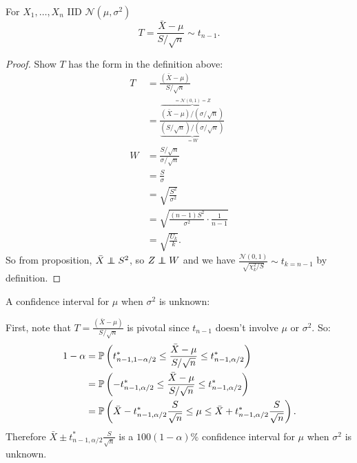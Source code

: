 \documentclass[10pt, a4paper]{article}
\begin{document}
\begin{proposition}
    For $X_1, \dotsc, X_n$ IID $\mathcal{N}(\mu, \sigma ^ 2)$
    \[
    T = \frac{\bar{X} - \mu}{S / \sqrt{n}} \sim t_{n - 1}.
    \]

    \begin{proof}
        Show $T$ has the form in the definition above:
        \begin{align*}
            T &= \frac{(\bar{X} - \mu)}{S / \sqrt{n}} \\
            &= \frac{\overbrace{(\bar{X} - \mu) / (\sigma / \sqrt{n})}^{= \mathcal{N}(0, 1) = Z}}{\underbrace{(S / \sqrt{n}) / (\sigma / \sqrt{n})}_{= W}} \\
            W &= \frac{S / \sqrt{n}}{\sigma / \sqrt{n}} \\
            &= \frac{S}{\sigma} \\
            &= \sqrt{\frac{S ^ 2}{\sigma ^ 2}} \\
            &= \sqrt{\frac{(n - 1)S ^ 2}{\sigma ^ 2}\cdot\frac{1}{n - 1}} \\
            &= \sqrt{\frac{U_k}{k}}.
        \end{align*}
        So from proposition,
        $\bar{X} \independent S ^ 2$,
        so $Z \independent W$ and we have $\frac{\mathcal{N}(0, 1)}{\sqrt{\chi_{k}^{2} / S}} \sim t_{k = n - 1}$ by definition.
    \end{proof}
\end{proposition}

A confidence interval for $\mu$ when $\sigma ^ 2$ is unknown:
\begin{proposition}
    First,
    note that $T = \frac{(\bar{X} - \mu)}{S / \sqrt{n}}$ is pivotal since $t_{n - 1}$ doesn't involve $\mu$ or $\sigma ^ 2$.
    So:
    \begin{align*}
        1 - \alpha &= \P\left(t_{n - 1, 1 - \alpha / 2}^{*} \leq \frac{\bar{X} - \mu}{S / \sqrt{n}} \leq t_{n - 1, \alpha / 2}^{*}\right) \\
        &= \P\left(-t_{n - 1, \alpha / 2}^{*} \leq \frac{\bar{X} - \mu}{S / \sqrt{n}} \leq t_{n - 1, \alpha / 2}^{*}\right)  \\
        &= \P\left(\bar{X} - t_{n - 1, \alpha / 2}^{*}\frac{S}{\sqrt{n}} \leq \mu \leq \bar{X} + t_{n - 1, \alpha / 2}^{*}\frac{S}{\sqrt{n}}\right).
    \end{align*}
    Therefore $\bar{X} \pm t_{n - 1, \alpha / 2}^{*}\frac{S}{\sqrt{n}}$ is a $100(1 - \alpha)\%$ confidence interval for $\mu$ when $\sigma ^ 2$ is unknown.
\end{proposition}
\end{document}
